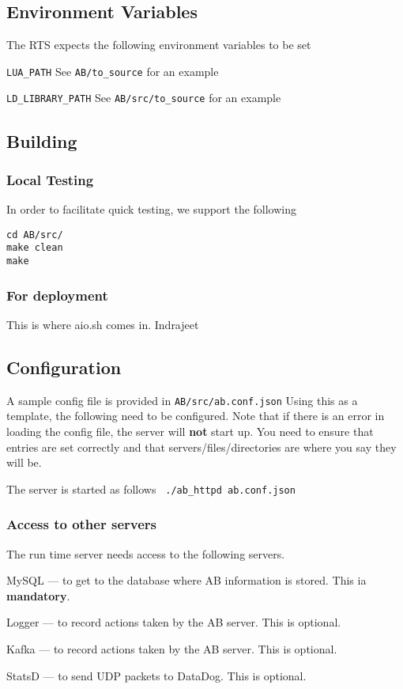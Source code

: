 \documentclass[letterpaper]{article}
\begin{document}
\subsection{Environment Variables}

The RTS expects the following environment variables to be set
\be
\item \verb+LUA_PATH+ 
  See \verb+AB/to_source+ for an example
\item \verb+LD_LIBRARY_PATH+
  See \verb+AB/src/to_source+ for an example
  \ee

\subsection{Building}

\subsubsection{Local Testing}
In order to facilitate quick testing, we support the following
\begin{verbatim}
cd AB/src/
make clean
make
\end{verbatim}

\subsubsection{For deployment}

This is where aio.sh comes in. Indrajeet \TBC

\subsection{Configuration}
A sample config file is provided in 
\verb+AB/src/ab.conf.json+ Using this as a template, the following need to be
configured. Note that if there is an error in loading the config file, the
server will {\bf not} start up. You need to ensure that entries are set
correctly and that servers/files/directories are where you say they will be.

The server is started as follows \verb+ ./ab_httpd ab.conf.json+

\subsubsection{Access to other servers}

The run time server needs access to the following servers. 
\be
\item MySQL --- to get to the database where AB information is stored. This ia
  {\bf mandatory}.
\item Logger --- to record actions taken by the AB server. This is optional.
\item Kafka --- to record actions taken by the AB server. This is optional.
\item StatsD --- to send UDP packets to DataDog. This is optional.
\ee
\end{document}
